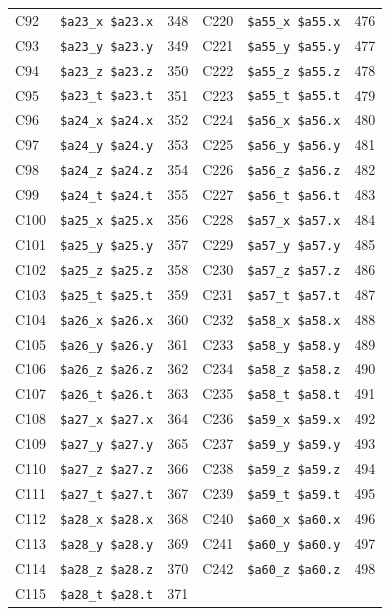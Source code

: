 \begin{table}
\begin{center}
{\begin{tabular}{|l|l|l||l|l|l|}
C92 & \verb|$a23_x $a23.x| & 348 &
C220 & \verb|$a55_x $a55.x| & 476 \\
C93 & \verb|$a23_y $a23.y| & 349 &
C221 & \verb|$a55_y $a55.y| & 477 \\
C94 & \verb|$a23_z $a23.z| & 350 &
C222 & \verb|$a55_z $a55.z| & 478 \\
C95 & \verb|$a23_t $a23.t| & 351 &
C223 & \verb|$a55_t $a55.t| & 479 \\
C96 & \verb|$a24_x $a24.x| & 352 &
C224 & \verb|$a56_x $a56.x| & 480 \\
C97 & \verb|$a24_y $a24.y| & 353 &
C225 & \verb|$a56_y $a56.y| & 481 \\
C98 & \verb|$a24_z $a24.z| & 354 &
C226 & \verb|$a56_z $a56.z| & 482 \\
C99 & \verb|$a24_t $a24.t| & 355 &
C227 & \verb|$a56_t $a56.t| & 483 \\
C100 & \verb|$a25_x $a25.x| & 356 &
C228 & \verb|$a57_x $a57.x| & 484 \\
C101 & \verb|$a25_y $a25.y| & 357 &
C229 & \verb|$a57_y $a57.y| & 485 \\
C102 & \verb|$a25_z $a25.z| & 358 &
C230 & \verb|$a57_z $a57.z| & 486 \\
C103 & \verb|$a25_t $a25.t| & 359 &
C231 & \verb|$a57_t $a57.t| & 487 \\
C104 & \verb|$a26_x $a26.x| & 360 &
C232 & \verb|$a58_x $a58.x| & 488 \\
C105 & \verb|$a26_y $a26.y| & 361 &
C233 & \verb|$a58_y $a58.y| & 489 \\
C106 & \verb|$a26_z $a26.z| & 362 &
C234 & \verb|$a58_z $a58.z| & 490 \\
C107 & \verb|$a26_t $a26.t| & 363 &
C235 & \verb|$a58_t $a58.t| & 491 \\
C108 & \verb|$a27_x $a27.x| & 364 &
C236 & \verb|$a59_x $a59.x| & 492 \\
C109 & \verb|$a27_y $a27.y| & 365 &
C237 & \verb|$a59_y $a59.y| & 493 \\
C110 & \verb|$a27_z $a27.z| & 366 &
C238 & \verb|$a59_z $a59.z| & 494 \\
C111 & \verb|$a27_t $a27.t| & 367 &
C239 & \verb|$a59_t $a59.t| & 495 \\
C112 & \verb|$a28_x $a28.x| & 368 &
C240 & \verb|$a60_x $a60.x| & 496 \\
C113 & \verb|$a28_y $a28.y| & 369 &
C241 & \verb|$a60_y $a60.y| & 497 \\
C114 & \verb|$a28_z $a28.z| & 370 &
C242 & \verb|$a60_z $a60.z| & 498 \\
C115 & \verb|$a28_t $a28.t| & 371 &

\end{tabular}}
\end{center}
\end{table}

